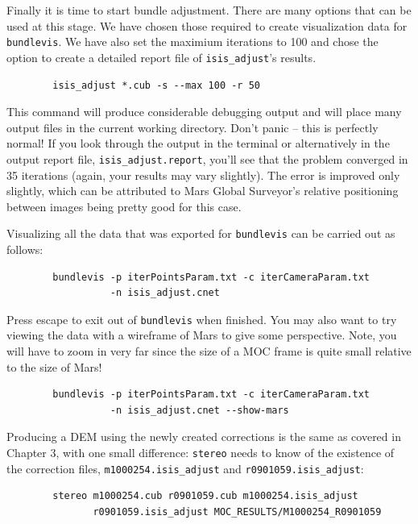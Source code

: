 Finally it is time to start bundle adjustment. There are many options
that can be used at this stage.  We have chosen those required to
create visualization data for \texttt{bundlevis}.  We have also set
the maximium iterations to 100 and chose the option to create a
detailed report file of \texttt{isis\_adjust}'s results.

\begin{verbatim}
        isis_adjust *.cub -s --max 100 -r 50
\end{verbatim}

This command will produce considerable debugging output and will place
many output files in the current working directory. Don't panic --
this is perfectly normal! If you look through the output in the
terminal or alternatively in the output report file,
\verb=isis_adjust.report=, you'll see that the problem converged in 35
iterations (again, your results may vary slightly).  The error is
improved only slightly, which can be attributed to Mars Global
Surveyor's relative positioning between images being pretty good for
this case.

Visualizing all the data that was exported for \texttt{bundlevis} can
be carried out as follows:

\begin{verbatim}
        bundlevis -p iterPointsParam.txt -c iterCameraParam.txt 
                  -n isis_adjust.cnet
\end{verbatim}

Press escape to exit out of \texttt{bundlevis} when finished.  You may
also want to try viewing the data with a wireframe of Mars to give
some perspective. Note, you will have to zoom in very far since the
size of a MOC frame is quite small relative to the size of Mars!

\begin{verbatim}
        bundlevis -p iterPointsParam.txt -c iterCameraParam.txt
                  -n isis_adjust.cnet --show-mars
\end{verbatim}

Producing a DEM using the newly created corrections is the same as
covered in Chapter 3, with one small difference: \texttt{stereo} needs
to know of the existence of the correction files,
\verb=m1000254.isis_adjust= and \verb=r0901059.isis_adjust=:

\begin{verbatim}
        stereo m1000254.cub r0901059.cub m1000254.isis_adjust
               r0901059.isis_adjust MOC_RESULTS/M1000254_R0901059
\end{verbatim}

